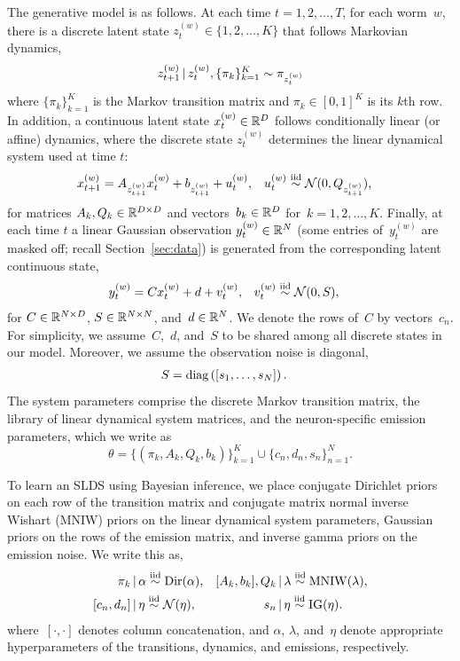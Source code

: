 \documentclass{article}
\begin{document}
The generative model is as follows. At each time ${t=1,2,\ldots,T}$,
for each worm~$w$,
there is a discrete latent state ${z_t^{(w)} \in \{1,2, \ldots,K\}}$ that
follows Markovian dynamics,
\begin{equation}
  z_{t+1}^{(w)} \,|\, z_t^{(w)}, \{\pi_k\}_{k=1}^K  \sim \pi_{z_t^{(w)}}
  \label{eq:markov_z}
\end{equation}
where ${\{\pi_k\}_{k=1}^K}$ is the Markov transition matrix and
${\pi_k \in [0,1]^K}$ is its $k$th row. 
In addition, a continuous latent state ${x_t^{(w)} \in \mathbb{R}^D}$ follows
conditionally linear (or affine) dynamics, where the discrete state $z_t^{(w)}$
determines the linear dynamical system used at time $t$:
\begin{align}
  x_{t+1}^{(w)} &= A_{z_{t+1}^{(w)}} x_{t}^{(w)} + b_{z_{t+1}^{(w)}} +  u_t^{(w)},
  &
  u_t^{(w)} &\stackrel{\text{iid}}{\sim} \mathcal{N}(0,Q_{z_{t+1}^{(w)}}),
  \label{eq:slds_start}
\end{align}
for matrices ${A_k, Q_k \in \mathbb{R}^{D \times D}}$ and vectors~${b_k\in
\mathbb{R}^D}$ for~${k=1,2,\ldots,K}$.
Finally, at each time $t$ a linear Gaussian observation $y_t^{(w)} \in \mathbb{R}^N$
(some entries of~$y_t^{(w)}$ are masked off; recall Section~\ref{sec:data}) is
generated from the corresponding latent continuous state,
\begin{align}
  y_t^{(w)} &= C x_t^{(w)} + d + v_t^{(w)}, & v_t^{(w)} &\stackrel{\text{iid}}{\sim} \mathcal{N}(0,S),
    \label{eq:slds_end}
\end{align}
for $C \in \mathbb{R}^{N \times D}$, $S \in \mathbb{R}^{N \times N}$,
and~$d \in \mathbb{R}^N$. We denote the rows of~$C$ by vectors~$c_n$.
For simplicity, we assume~$C$,~$d$, and~$S$ to
be shared among all discrete states in our model.  Moreover, we assume
the observation noise is diagonal,
\begin{align*}
  S &= \textrm{diag}\left(\left[s_{1}, \ldots, s_{N} \right] \right). 
\end{align*}
The system parameters comprise the discrete Markov transition matrix, the
library of linear dynamical system matrices, and the neuron-specific
emission parameters, which we write as
\begin{equation*}
  \theta = \{(\pi_k, A_k, Q_k, b_k)\}_{k=1}^K \cup \{c_n, d_n, s_n\}_{n=1}^N.
\end{equation*}

To learn an SLDS using Bayesian inference, we place conjugate Dirichlet priors
on each row of the transition matrix and conjugate matrix normal
inverse Wishart (MNIW) priors on the linear dynamical system parameters,
Gaussian priors on the rows of the emission matrix,
and inverse gamma priors on the emission noise.
We write this as,
\begin{align*}
  \pi_k &\,|\, \alpha \stackrel{\text{iid}}{\sim} \mathrm{Dir}(\alpha),
  &
  [A_k, b_k], Q_k &\,|\, \lambda \stackrel{\text{iid}}{\sim} \mathrm{MNIW}(\lambda),
  \\
  [c_n, d_n] &\,|\, \eta \stackrel{\text{iid}}{\sim} \mathcal{N}(\eta),
  &
  s_{n} &\,|\, \eta \stackrel{\text{iid}}{\sim} \mathrm{IG}(\eta).
\end{align*}
where~$[\cdot, \cdot]$ denotes column concatenation, and $\alpha$, $\lambda$,
and~$\eta$ denote appropriate hyperparameters of the transitions, dynamics, and
emissions, respectively.
\end{document}
